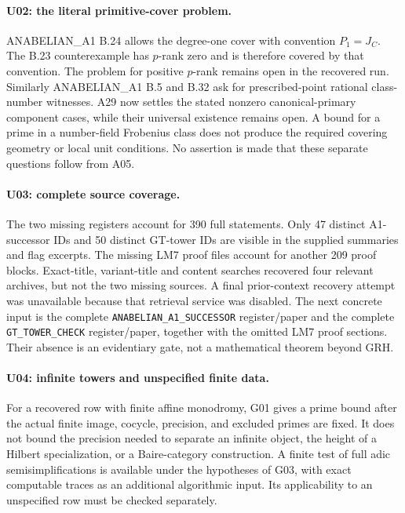 \documentclass[11pt,a4paper]{article}
\begin{document}
\paragraph{U02: the literal primitive-cover problem.}
ANABELIAN\_A1 B.24 allows the degree-one cover with convention
$P_1=J_C$. The B.23 counterexample has $p$-rank zero and is therefore
covered by that convention. The problem for positive $p$-rank
remains open in the recovered run. Similarly ANABELIAN\_A1 B.5 and
B.32 ask for prescribed-point rational class-number witnesses. A29
now settles the stated nonzero canonical-primary component cases,
while their universal existence remains open.
A bound for a prime in a number-field Frobenius class does not
produce the required covering geometry or local unit conditions.
No assertion is made that these separate questions follow from A05.

\paragraph{U03: complete source coverage.}
The two missing registers account for 390 full statements. Only
47 distinct A1-successor IDs and 50 distinct GT-tower IDs are visible
in the supplied summaries and flag excerpts. The missing LM7
proof files account for another 209 proof blocks. Exact-title,
variant-title and content searches recovered four relevant archives,
but not the two missing sources. A final prior-context recovery
attempt was unavailable because that retrieval service was disabled.
The next concrete input is the complete
\texttt{ANABELIAN\_A1\_SUCCESSOR} register/paper and the complete
\texttt{GT\_TOWER\_CHECK} register/paper, together with the omitted
LM7 proof sections. Their absence is an evidentiary gate, not a
mathematical theorem beyond GRH.

\paragraph{U04: infinite towers and unspecified finite data.}
For a recovered row with finite affine monodromy, G01 gives a
prime bound after the actual finite image, cocycle, precision,
and excluded primes are fixed. It does not bound the precision
needed to separate an infinite object, the height of a Hilbert
specialization, or a Baire-category construction. A finite test of
full adic semisimplifications is available under the hypotheses of
G03, with exact computable traces as an additional algorithmic input.
Its applicability to an unspecified row must be checked separately.
\end{document}
